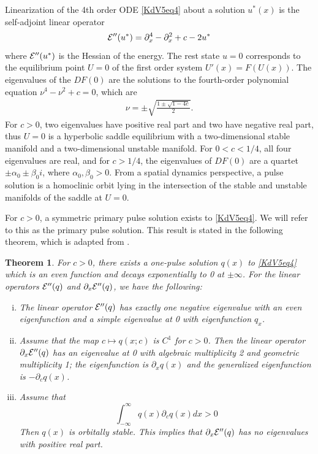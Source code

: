 \documentclass[10pt,reqno]{amsart}
\theoremstyle{plain}
\newtheorem{theorem}{Theorem}
\theoremstyle{definition}
\theoremstyle{remark}
\numberwithin{theorem}{section}
\numberwithin{equation}{section}
\begin{document}
Linearization of the 4th order ODE \cref{KdV5eq4} about a solution $u^*(x)$ is the self-adjoint linear operator
\begin{equation}\label{KdV5hessian}
\mathcal{E}''(u^*) = \partial_x^4 - \partial_x^2 + c - 2 u^* 
\end{equation}
where $\mathcal{E}''(u^*)$ is the Hessian of the energy. The rest state $u = 0$ corresponds to the equilibrium point $U = 0$ of the first order system $U'(x) = F(U(x))$. The eigenvalues of the $DF(0)$ are the solutions to the fourth-order polynomial equation $\nu^4 - \nu^2 + c = 0$, which are
\begin{align}
\nu = \pm \sqrt{ \frac{1 \pm \sqrt{1 - 4c} }{2}}.
\end{align}
For $c > 0$, two eigenvalues have positive real part and two have negative real part, thus $U = 0$ is a hyperbolic saddle equilibrium with a two-dimensional stable manifold and a two-dimensional unstable manifold. For $0 < c < 1/4$, all four eigenvalues are real, and for $c > 1/4$, the eigenvalues of $DF(0)$ are a quartet $\pm \alpha_0 \pm \beta_0 i$, where $\alpha_0, \beta_0 > 0$. From a spatial dynamics perspective, a pulse solution is a homoclinic orbit lying in the intersection of the stable and unstable manifolds of the saddle at $U = 0$.

For $c > 0$, a symmetric primary pulse solution exists to \cref{KdV5eq4}. We will refer to this as the primary pulse solution. This result is stated in the following theorem, which is adapted from \cite[Theorem 2.1]{Pelinovsky2007}.

\begin{theorem}\label{KdV1pulse}
For $c > 0$, there exists a one-pulse solution $q(x)$ to \cref{KdV5eq4} which is an even function and decays exponentially to 0 at $\pm \infty$. For the linear operators $\mathcal{E}''(q)$ and $\partial_x \mathcal{E}''(q)$, we have the following:
\begin{enumerate}[(i)]
\item The linear operator $\mathcal{E}''(q)$ has exactly one negative eigenvalue with an even eigenfunction and a simple eigenvalue at 0 with eigenfunction $q_x$.
\item Assume that the map $c \mapsto q(x; c)$ is $C^1$ for $c > 0$. Then the linear operator $\partial_x \mathcal{E}''(q)$ has an eigenvalue at 0 with algebraic multiplicity 2 and geometric multiplicity 1; the eigenfunction is $\partial_x q(x)$ and the generalized eigenfunction is $-\partial_c q(x)$. 
\item Assume that 
\begin{equation}\label{KdV5stabhyp}
\int_{-\infty}^\infty q(x) \partial_c q(x) dx > 0
\end{equation}
Then $q(x)$ is orbitally stable. This implies that $\partial_x \mathcal{E}''(q)$ has no eigenvalues with positive real part.
\end{enumerate}
\end{theorem}
\end{document}
